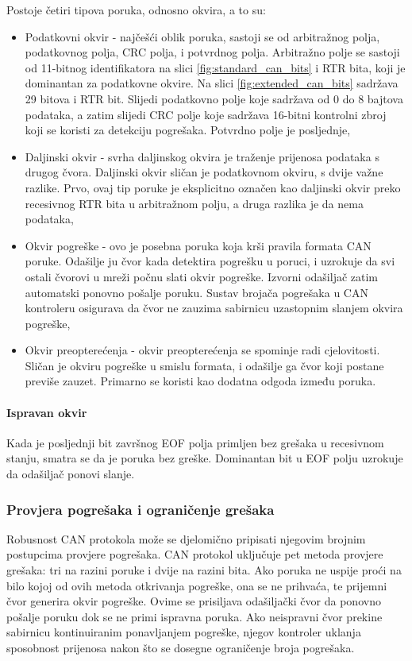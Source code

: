 Postoje četiri tipova poruka, odnosno okvira, a to su:
\begin{itemize}
	\item Podatkovni okvir - najčešći oblik poruka, sastoji se od arbitražnog polja, podatkovnog polja, CRC polja, i potvrdnog polja. Arbitražno polje se sastoji od 11-bitnog identifikatora na slici \ref{fig:standard_can_bits} i RTR bita, koji je dominantan za podatkovne okvire. Na slici \ref{fig:extended_can_bits} sadržava 29 bitova i RTR bit. Slijedi podatkovno polje koje sadržava od 0 do 8 bajtova podataka, a zatim slijedi CRC polje koje sadržava 16-bitni kontrolni zbroj koji se koristi za detekciju pogrešaka. Potvrdno polje je posljednje,
	\item Daljinski okvir - svrha daljinskog okvira je traženje prijenosa podataka s drugog čvora. Daljinski okvir sličan je podatkovnom okviru, s dvije važne razlike. Prvo, ovaj tip poruke je eksplicitno označen kao daljinski okvir preko recesivnog RTR bita u arbitražnom polju, a druga razlika je da nema podataka,
	\item Okvir pogreške - ovo je posebna poruka koja krši pravila formata CAN poruke. Odašilje ju čvor kada detektira pogrešku u poruci, i uzrokuje da svi ostali čvorovi u mreži počnu slati okvir pogreške. Izvorni odašiljač zatim automatski ponovno pošalje poruku. Sustav brojača pogrešaka u CAN kontroleru osigurava da čvor ne zauzima sabirnicu uzastopnim slanjem okvira pogreške,
	\item Okvir preopterećenja - okvir preopterećenja se spominje radi cjelovitosti. Sličan je okviru pogreške u smislu formata, i odašilje ga čvor koji postane previše zauzet. Primarno se koristi kao dodatna odgoda između poruka.
\end{itemize}

\paragraph{Ispravan okvir}

Kada je posljednji bit završnog EOF polja primljen bez grešaka u recesivnom stanju, smatra se da je poruka bez greške. Dominantan bit u EOF polju uzrokuje da odašiljač ponovi slanje.

\subsubsection{Provjera pogrešaka i ograničenje grešaka}

Robusnost CAN protokola može se djelomično pripisati njegovim brojnim postupcima provjere pogrešaka. CAN protokol uključuje pet metoda provjere grešaka: tri na razini poruke i dvije na razini bita. Ako poruka ne uspije proći na bilo kojoj od ovih metoda otkrivanja pogreške, ona se ne prihvaća, te prijemni čvor generira okvir pogreške. Ovime se prisiljava odašiljački čvor da ponovno pošalje poruku dok se ne primi ispravna poruka. Ako neispravni čvor prekine sabirnicu kontinuiranim ponavljanjem pogreške, njegov kontroler uklanja sposobnost prijenosa nakon što se dosegne ograničenje broja pogrešaka.

